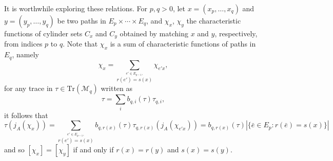 \documentclass[12pt]{amsart}
\theoremstyle{plain}
\theoremstyle{definition}
\begin{document}
It is worthwhile exploring these relations. For $p,q>0$, let $x = (x_p,\dots, x_q)$ and $y = (y_p,\dots, y_q)$ be two paths in $E_p\times \cdots \times E_q$, and $\chi_x$, $\chi_y$ the characteristic functions of cylinder sets $C_x$ and $C_y$ obtained by matching $x$ and $y$, respectively, from indices $p$ to $q$. Note that $\chi_x$ is a sum of characteristic functions of paths in $E_q$, namely
$$\chi_x = \sum_{\overset{e'\in E_{p-1},}{ r(e') = s(x)}}\chi_{e'x},$$
for any trace in $\tau \in \mathrm{Tr}(\mathcal{M}_q)$ written as
$$\tau = \sum_{i} b_{q,i}(\tau)\tau_{q,i},$$
it follows that
$$\tau(j_A(\chi_x)) = \sum_{\overset{e'\in E_{p-1},}{ r(e') = s(x)}} b_{q,r(x)}(\tau) \tau_{q,r(x)}(j_A(\chi_{e'x})) = b_{q,r(x)}(\tau) |\{\bar{e}\in E_p:r(\bar{e}) = s(x)\}|$$
and so $[\chi_{x}]= [\chi_{y}]$ if and only if $r(x) = r(y)$ and $s(x) = s(y)$.
\end{document}
